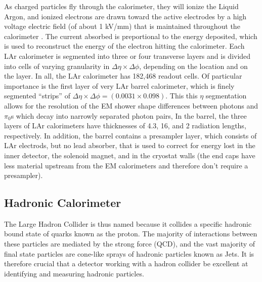 As charged particles fly through the calorimeter, they will ionize the Liquid Argon, and ionized electrons are drawn toward the active electrodes by a high voltage electric field (of about 1 kV/mm) that is maintained throughout the calorimeter \cite{LAR_READINESS}. %
The current absorbed is preportional to the energy deposited, which is used to reconstruct the energy of the electron hitting the calorimeter.
Each LAr calorimeter is segmented into three or four transverse layers and is divided into cells of varying granularity in  $\Delta \eta \times \Delta \phi$, depending on the location and on the layer.%
In all, the LAr calorimeter has 182,468 readout cells.
Of particular importance is the first layer of very LAr barrel calorimeter, which is finely segmented ``strips'' of  $\Delta \eta \times \Delta \phi = (0.0031 \times 0.098)$. 
This this $\eta$ segmentation allows for the resolution of the EM shower shape differences between photons and $\pi_{0}$s which decay into narrowly separated photon pairs, 
In the barrel, the three layers of LAr calorimeters have thicknesses of 4.3, 16, and 2 radiation lengths, respectively.
In addition, the barrel contains a presampler layer, which consists of LAr electrods, but no lead absorber, that is used to correct for energy lost in the inner detector, the solenoid magnet, and in the cryostat walls (the end caps have less material upstream from the EM calorimeters and therefore don't require a presampler). %



\subsection{Hadronic Calorimeter}
The Large Hadron Collider is thus named because it collides a specific hadronic bound state of quarks known as the proton.
The majority of interactions between these particles are mediated by the strong force (QCD), and the vast majority of final state particles are cone-like sprays of hadronic particles known as Jets.
It is therefore crucial that a detector working with a hadron collider be excellent at identifying and measuring hadronic particles.

